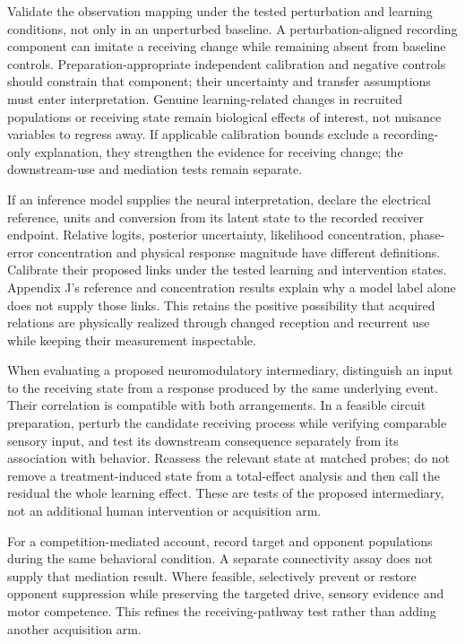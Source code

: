 \documentclass[
  american,
  11pt,
  letterpaper,
]{article}
\begin{document}
Validate the observation mapping under the tested perturbation and learning conditions, not only in an unperturbed baseline. A perturbation-aligned recording component can imitate a receiving change while remaining absent from baseline controls. Preparation-appropriate independent calibration and negative controls should constrain that component; their uncertainty and transfer assumptions must enter interpretation. Genuine learning-related changes in recruited populations or receiving state remain biological effects of interest, not nuisance variables to regress away. If applicable calibration bounds exclude a recording-only explanation, they strengthen the evidence for receiving change; the downstream-use and mediation tests remain separate.

If an inference model supplies the neural interpretation, declare the electrical reference, units and conversion from its latent state to the recorded receiver endpoint. Relative logits, posterior uncertainty, likelihood concentration, phase-error concentration and physical response magnitude have different definitions. Calibrate their proposed links under the tested learning and intervention states. Appendix J's reference and concentration results explain why a model label alone does not supply those links. This retains the positive possibility that acquired relations are physically realized through changed reception and recurrent use while keeping their measurement inspectable.

When evaluating a proposed neuromodulatory intermediary, distinguish an input to the receiving state from a response produced by the same underlying event. Their correlation is compatible with both arrangements. In a feasible circuit preparation, perturb the candidate receiving process while verifying comparable sensory input, and test its downstream consequence separately from its association with behavior. Reassess the relevant state at matched probes; do not remove a treatment-induced state from a total-effect analysis and then call the residual the whole learning effect. These are tests of the proposed intermediary, not an additional human intervention or acquisition arm.

For a competition-mediated account, record target and opponent populations during the same behavioral condition. A separate connectivity assay does not supply that mediation result. Where feasible, selectively prevent or restore opponent suppression while preserving the targeted drive, sensory evidence and motor competence. This refines the receiving-pathway test rather than adding another acquisition arm.
\end{document}
